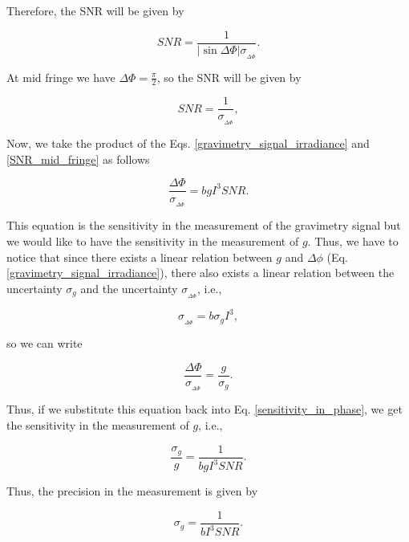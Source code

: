 \documentclass{article}
\begin{document}
Therefore, the SNR will be given by

\begin{equation}
    SNR = \frac{1}{|\sin{\Delta \Phi}|  \sigma_{_{\Delta \Phi}}}.
\end{equation}

At mid fringe we have $\Delta \Phi = \frac{\pi}{2}$, so the SNR will be given by

\begin{equation}\label{SNR_mid_fringe}
    SNR = \frac{1}{\sigma_{_{\Delta \Phi}}},
\end{equation}

Now, we take the product of the Eqs. \ref{gravimetry_signal_irradiance} and \ref{SNR_mid_fringe} as follows

\begin{equation}\label{sensitivity_in_phase}
    \frac{\Delta \Phi}{\sigma_{_{\Delta \Phi}}} = b g I^3 SNR.
\end{equation}

This equation is the sensitivity in the measurement of the gravimetry signal but we would like to have the sensitivity in the measurement of $g$. Thus,
we have to notice that since there exists a linear relation between $g$ and $\Delta \phi$ (Eq. \ref{gravimetry_signal_irradiance}), there also exists a linear relation between the uncertainty $\sigma_{g}$ and the uncertainty $\sigma_{_{\Delta \Phi}}$, i.e.,

\begin{equation}
    \sigma_{_{\Delta \Phi}} = b \sigma_{g} I^3,
\end{equation}

so we can write 

\begin{equation}
    \frac{\Delta \Phi}{\sigma_{_{\Delta \Phi}}} = \frac{g}{\sigma_{g}}.
\end{equation}

Thus, if we substitute this equation back into Eq. \ref{sensitivity_in_phase}, we get the sensitivity in the measurement of $g$, i.e.,

\begin{equation}\label{sensitivity_eq}
    \frac{\sigma_{g}}{g} = \frac{1}{b g I^3 SNR}.
\end{equation}

Thus, the precision in the measurement is given by

\begin{equation}\label{precision_eq}
    \sigma_{g} = \frac{1}{b I^3 SNR}.
\end{equation}
\end{document}
